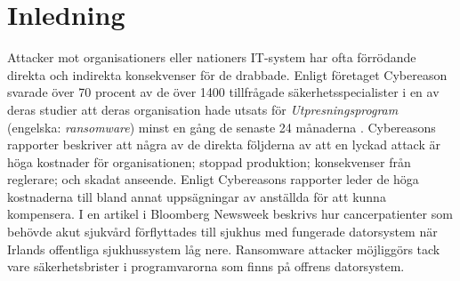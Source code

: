 \section{Inledning}
Attacker mot organisationers eller nationers IT-system har ofta förrödande
direkta och indirekta konsekvenser för de drabbade. Enligt företaget Cybereason
svarade över 70 procent av de över 1400 tillfrågade säkerhetsspecialister i en
av deras studier att deras organisation hade utsats för
\emph{Utpresningsprogram} (engelska: \emph{ransomware}) minst en gång de senaste
24 månaderna \cite{cyberreason2021, cyberreason2022}. Cybereasons rapporter
beskriver att några av de direkta följderna av att en lyckad attack är höga
kostnader för organisationen; stoppad produktion; konsekvenser från reglerare;
och skadat anseende. Enligt Cybereasons rapporter leder de höga kostnaderna till
bland annat uppsägningar av anställda för att kunna kompensera. I en artikel i
Bloomberg Newsweek \cite{gallagher2023} beskrivs hur cancerpatienter som behövde
akut sjukvård förflyttades till sjukhus med fungerade datorsystem när Irlands
offentliga sjukhussystem låg nere. \cite{hse_report} Ransomware attacker
möjliggörs tack vare säkerhetsbrister i programvarorna som finns på offrens
datorsystem.





